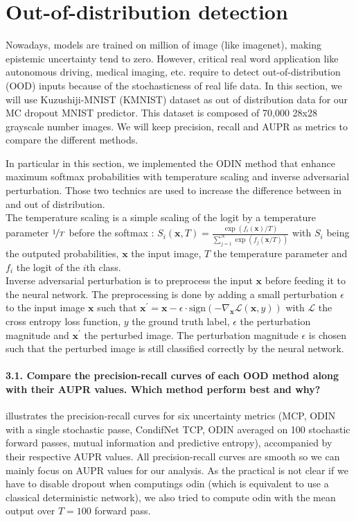 \section{Out-of-distribution detection}
Nowadays, models are trained on million of image (like imagenet), making epistemic uncertainty tend to zero. However, critical real word application like autonomous driving, medical imaging, etc. require to detect out-of-distribution (OOD) inputs because of the stochasticness of real life data. In this section, we will use Kuzushiji-MNIST (KMNIST) dataset as out of distribution data for our MC dropout MNIST predictor. This dataset is composed of 70,000 28x28 grayscale number images. We will keep precision, recall and AUPR as metrics to compare the different methods. 

In particular in this section, we implemented the ODIN method \citep{ODIN} that enhance maximum softmax probabilities with temperature scaling and inverse adversarial perturbation. Those two technics are used to increase the difference between in and out of distribution.\\
The temperature scaling is a simple scaling of the logit by a temperature parameter $ \nicefrac{1}{T} $ before the softmax : $ S_i(\boldsymbol{x}, T) = \frac{\exp (f_i(\boldsymbol{x}) / T)}{\sum_{j=1}^{N} \exp (f_j(\boldsymbol{x} / T))} $ with $ S_i $ being the outputed probabilities, $ \boldsymbol{x} $ the input image, $ T $ the temperature parameter and $ f_i $ the logit of the $ i $th class.\\
Inverse adversarial perturbation is to preprocess the input $ \boldsymbol{x} $ before feeding it to the neural network. The preprocessing is done by adding a small perturbation $ \epsilon $ to the input image $ \boldsymbol{x} $ such that $ \boldsymbol{x}^\prime = \boldsymbol{x} - \epsilon \cdot \text{sign}(-\nabla_{\boldsymbol{x}} \mathcal{L}(\boldsymbol{x}, y)) $ with $ \mathcal{L} $ the cross entropy loss function, $ y $ the ground truth label, $ \epsilon $ the perturbation magnitude and $ \boldsymbol{x}^\prime $ the perturbed image. The perturbation magnitude $ \epsilon $ is chosen such that the perturbed image is still classified correctly by the neural network.

\paragraph*{3.1. Compare the precision-recall curves of each OOD method along with their AUPR values. Which method perform best and why?}
 illustrates the precision-recall curves for six uncertainty metrics (MCP, ODIN with a single stochastic passe, CondifNet TCP, ODIN averaged on 100 stochastic forward passes, mutual information and predictive entropy), accompanied by their respective AUPR values. All precision-recall curves are smooth so we can mainly focus on AUPR values for our analysis. As the practical is not clear if we have to disable dropout when computings odin (which is equivalent to use a classical deterministic network), we also tried to compute odin with the mean output over $ T=100 $ forward pass.

